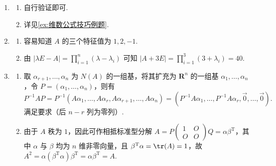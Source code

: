 \begin{enumerate}
    \item \begin{enumerate}
        \item 自行验证即可.
        \item 详见\autoref{ex:维数公式技巧例题}.
    \end{enumerate}

    \item \begin{enumerate}
        \item 容易知道 $A$ 的三个特征值为 $1,2,-1$.
        \item 由 $|\lambda E - A|=\prod_{i=1}^n (\lambda - \lambda_i)$ 可知 $|A+3E| = \prod_{i=1}^3 (3 + \lambda_i) = 40$.
    \end{enumerate}

    \item \begin{enumerate}
        \item 取 $\alpha_{r+1},\ldots,\alpha_n$ 为 $N(A)$ 的一组基，将其扩充为 $\mathbf{R}^n$ 的一组基 $\alpha_1, \ldots, \alpha_n$，令 $P=(\alpha_1,\ldots,\alpha_n)$，则有
        \[ P^{-1}AP = P^{-1}(A\alpha_1, \ldots, A\alpha_r, A\alpha_{r+1}, \ldots, A\alpha_n) = (P^{-1}A\alpha_1, \ldots, P^{-1}A\alpha_r, \vec{0}, \ldots, \vec{0}). \]
        满足要求（后 $n-r$ 列为零列）.
        \item 由于 $A$ 秩为 $1$，因此可作相抵标准型分解 $A = P\begin{pmatrix}
            1 & O \\
            O & O
        \end{pmatrix}Q=\alpha\beta^\mathrm{T}$，其中 $\alpha$ 与 $\beta$ 均为 $n$ 维非零向量，且 $\beta^\mathrm{T}\alpha=\tr(A)=1$，故 $A^2=\alpha(\beta^\mathrm{T}\alpha)\beta^\mathrm{T}=\alpha\beta^\mathrm{T}=A$.
    \end{enumerate}


\end{enumerate}
